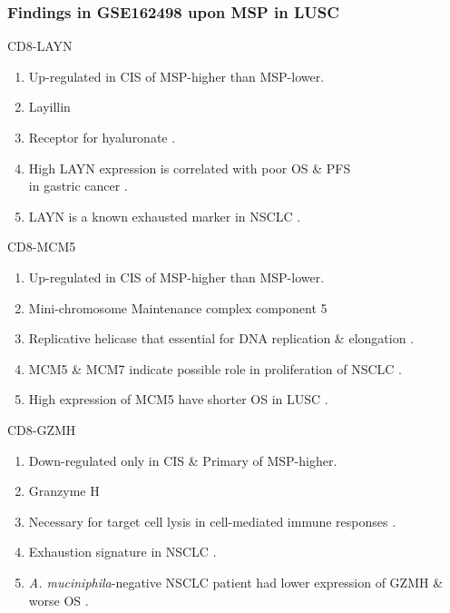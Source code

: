 \documentclass{beamer}
\begin{document}
    \begin{frame}[allowframebreaks]
        \frametitle{Findings in GSE162498 upon MSP in LUSC}

        \begin{block}{CD8-LAYN}
            \begin{enumerate}
                \item Up-regulated in CIS of MSP-higher than MSP-lower.
                \item Layillin
                \item Receptor for hyaluronate \cite{LAYN-1}.
                \item High LAYN expression is correlated with poor OS \& PFS \\
                    in gastric cancer \cite{LAYN-2}.
                \item LAYN is a known exhausted marker in NSCLC \cite{LAYN-3}.
            \end{enumerate}
        \end{block}

        \begin{block}{CD8-MCM5}
            \begin{enumerate}
                \item Up-regulated in CIS of MSP-higher than MSP-lower.
                \item Mini-chromosome Maintenance complex component 5
                \item Replicative helicase that essential for DNA replication \& elongation \cite{MCM5-2}.
                \item MCM5 \& MCM7 indicate possible role in proliferation of NSCLC \cite{MCM5-3}.
                \item High expression of MCM5 have shorter OS in LUSC \cite{MCM5-4}.
            \end{enumerate}
        \end{block}

        \begin{block}{CD8-GZMH}
            \begin{enumerate}
                \item Down-regulated only in CIS \& Primary of MSP-higher.
                \item Granzyme H
                \item Necessary for target cell lysis in cell-mediated immune responses \cite{GZMH-1, GZMH-2}.
                \item Exhaustion signature in NSCLC \cite{GZMH-3}.
                \item \textit{A. muciniphila}-negative NSCLC patient had lower expression of GZMH \& worse OS \cite{GZMH-4}.
            \end{enumerate}
        \end{block}


\end{frame}
\end{document}
